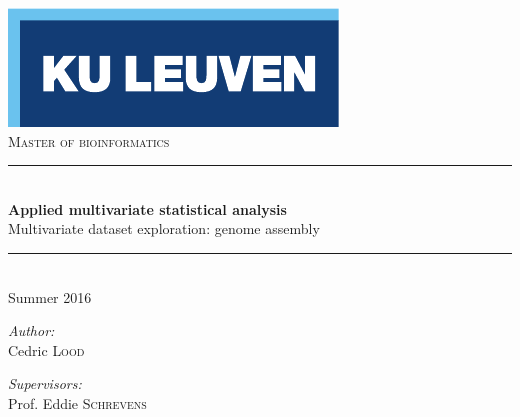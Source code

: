 \begin{titlepage}
  \begin{center}
    
    \includegraphics[scale=1.5]{figures/kuleuven_logo.pdf}~\\[4.5cm]
    \textsc{\Large Master of bioinformatics}\\[0.5cm]

    \rule{\linewidth}{0.3mm}\\[0.4cm]
    {\huge \bfseries Applied multivariate statistical analysis} \\[0.4cm]
    {\large Multivariate dataset exploration: genome assembly} \\[0.4cm]
    \rule{\linewidth}{0.3mm}\\[0.4cm]
    {\large Summer 2016} \\[1.0cm]
    
    \begin{minipage}{0.4\textwidth}
      \begin{flushleft} \large
        \emph{Author:}\\
	Cedric \textsc{Lood}
      \end{flushleft}
    \end{minipage}
    \begin{minipage}{0.4\textwidth}
      \vspace{25pt}
      \begin{flushright} \large
        \emph{Supervisors:} \\
        Prof. Eddie \textsc{Schrevens}\\
        \hfill \newline 
      \end{flushright}
    \end{minipage}
    
    \vfill


\end{center}
\end{titlepage}

